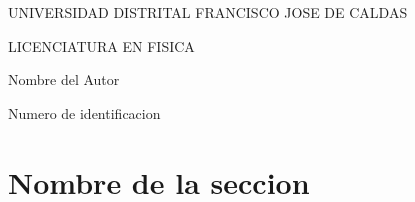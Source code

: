 \documentclass[10pt,a4paper]{article}
\author{Nombre del Autor}
\begin{document}
\begin{center}
UNIVERSIDAD DISTRITAL FRANCISCO JOSE DE CALDAS
\end{center}


\begin{center}
LICENCIATURA EN FISICA
\end{center}


\begin{center}
Nombre del Autor
\end{center}


\begin{center}
Numero de identificacion
\end{center}



\section{Nombre de la seccion}  	
\label{sec1} %

\end{document}
